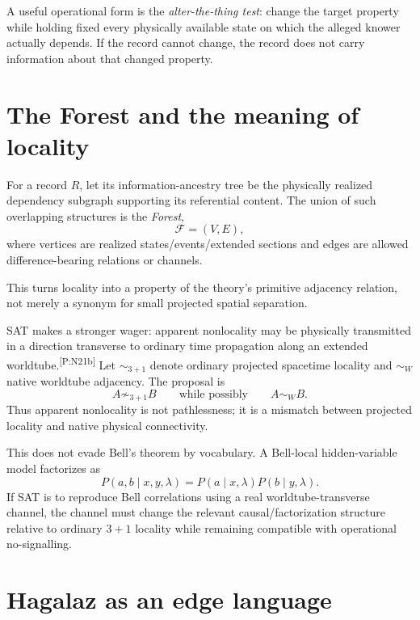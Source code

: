 \documentclass[11pt]{article}
\newcommand{\mcite}[1]{\textsuperscript{\tiny\textsf{[#1]}}}
\newcommand{\Forest}{\mathcal F}
\begin{document}
A useful operational form is the \emph{alter-the-thing test}: change the target property while holding fixed every physically available state on which the alleged knower actually depends. If the record cannot change, the record does not carry information about that changed property.

\section{The Forest and the meaning of locality}

For a record $R$, let its information-ancestry tree be the physically realized dependency subgraph supporting its referential content. The union of such overlapping structures is the \emph{Forest},
\begin{equation}
\Forest=(V,E),
\end{equation}
where vertices are realized states/events/extended sections and edges are allowed difference-bearing relations or channels.

This turns locality into a property of the theory's primitive adjacency relation, not merely a synonym for small projected spatial separation.

SAT makes a stronger wager: apparent nonlocality may be physically transmitted in a direction transverse to ordinary time propagation along an extended worldtube.\mcite{P:N21b} Let $\sim_{3+1}$ denote ordinary projected spacetime locality and $\sim_W$ native worldtube adjacency. The proposal is
\begin{equation}
A\not\sim_{3+1}B\qquad\text{while possibly}\qquad A\sim_W B.
\end{equation}
Thus apparent nonlocality is not pathlessness; it is a mismatch between projected locality and native physical connectivity.

This does not evade Bell's theorem by vocabulary. A Bell-local hidden-variable model factorizes as
\begin{equation}
P(a,b\mid x,y,\lambda)=P(a\mid x,\lambda)P(b\mid y,\lambda).
\end{equation}
If SAT is to reproduce Bell correlations using a real worldtube-transverse channel, the channel must change the relevant causal/factorization structure relative to ordinary $3+1$ locality while remaining compatible with operational no-signalling.

\section{Hagalaz as an edge language}
\end{document}
